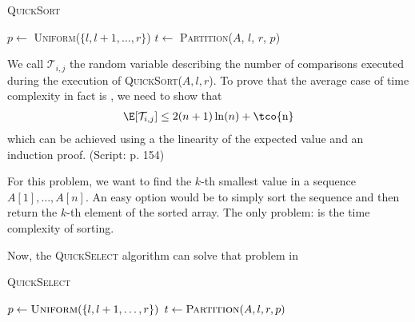 \begin{algorithm}
    \caption{\textsc{QuickSort}}
    \begin{algorithmic}[1]
                \State $p \gets$ \textsc{Uniform}($\{l, l + 1, \ldots, r\}$) 
                \State $t \gets$ \textsc{Partition}($A$, $l$, $r$, $p$) 
                \State {} 
                \State {} 
            \EndIf
        \EndProcedure
    \end{algorithmic}
\end{algorithm}


\newcommand{\qsv}{\mathcal{T}_{i, j}}
We call $\qsv$ the random variable describing the number of comparisons executed during the execution of \textsc{QuickSort}($A, l, r$).
To prove that the average case of time complexity in fact is , we need to show that
\begin{align*}
    \E[\qsv] \leq 2(n + 1) \ln(n) + \text{\tco{n}}
\end{align*}
which can be achieved using a the linearity of the expected value and an induction proof. (Script: p. 154)



For this problem, we want to find the $k$-th smallest value in a sequence $A[1], \ldots, A[n]$. An easy option would be to simply sort the sequence and then return the $k$-th element of the sorted array. The only problem:  is the time complexity of sorting.

Now, the \textsc{QuickSelect} algorithm can solve that problem in 
\begin{algorithm}
    \caption{\textsc{QuickSelect}}
    \begin{algorithmic}[1]
            \State $p \gets \textsc{Uniform}(\{l, l + 1, \ldots, r\})$ 
            \State $t \gets \textsc{Partition}(A, l, r, p)$
                \State {} 
                \State {} 
            \Else
                \State {} 
            \EndIf
        \EndProcedure
    \end{algorithmic}
\end{algorithm}



